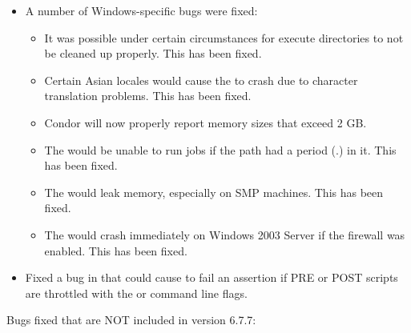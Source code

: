 \begin{itemize}
\item A number of Windows-specific bugs were fixed:
\begin{itemize}
  \item It was possible under certain circumstances for execute
  directories to not be cleaned up properly. This has been fixed.

  \item Certain Asian locales would cause the  to crash
  due to character translation problems. This has been fixed.

  \item Condor will now properly report memory sizes that exceed 2 GB.

  \item The  would be unable to run jobs if the \verb@LOG@
  path had a period (.) in it. This has been fixed.

  \item The  would leak memory, especially on SMP
  machines. This has been fixed.

  \item The  would crash immediately on Windows 2003
  Server if the firewall was enabled. This has been fixed.

\end{itemize}

\item Fixed a bug in  that could cause 
to fail an assertion if PRE or POST scripts are throttled with the
 or   command line flags.

\end{itemize}

\noindent Bugs fixed that are NOT included in version 6.7.7:

